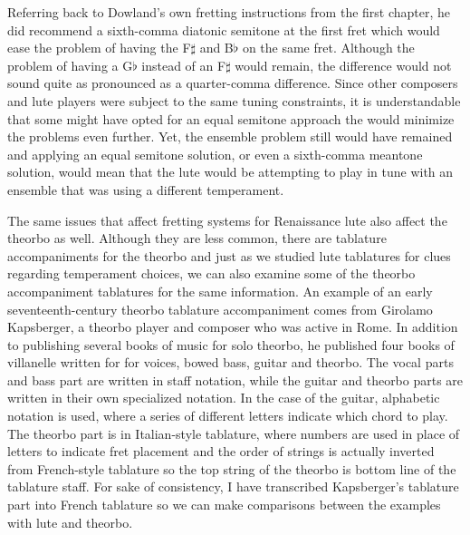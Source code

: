 Referring back to Dowland's own fretting instructions from the first chapter, he did
recommend a sixth-comma diatonic semitone at the first fret which would ease the
problem of having the F$\sharp$ and B$\flat$ on the same fret.  Although the problem of having
a G$\flat$ instead of an F$\sharp$ would remain, the difference would not sound quite as
pronounced as a quarter-comma difference.  Since other composers and lute players
were subject to the same tuning constraints, it is understandable that some might have
opted for an equal semitone approach the would minimize the problems even further.
Yet, the ensemble problem still would have remained and applying an equal
semitone solution, or even a sixth-comma meantone solution, would mean that the lute
would be attempting to play in tune with an ensemble that was using a different
temperament.

The same issues that affect fretting systems for Renaissance lute also affect the theorbo
as well.  Although they are less common, there are tablature accompaniments for the
theorbo and just as we studied lute tablatures for clues regarding temperament choices,
we can also examine some of the theorbo accompaniment tablatures for the same information.
An example of an early seventeenth-century theorbo tablature accompaniment comes from
Girolamo Kapsberger, a theorbo player and composer who was active in Rome. In addition
to publishing several books of music for solo theorbo, he published
four books of villanelle written for for voices, bowed bass, guitar and theorbo.  The
vocal parts and bass part are written in staff notation, while the guitar and theorbo
parts are written in their own specialized notation.  In the case of the guitar,
alphabetic notation is used, where a series of different letters indicate which chord to play.
The theorbo part is in Italian-style tablature, where numbers are used in place of letters
to indicate fret placement and the order of strings is actually inverted from French-style
tablature so the top string of the theorbo is bottom line of the tablature staff.  For
sake of consistency, I have transcribed Kapsberger's tablature part into French tablature
so we can make comparisons between the examples with lute and theorbo.

